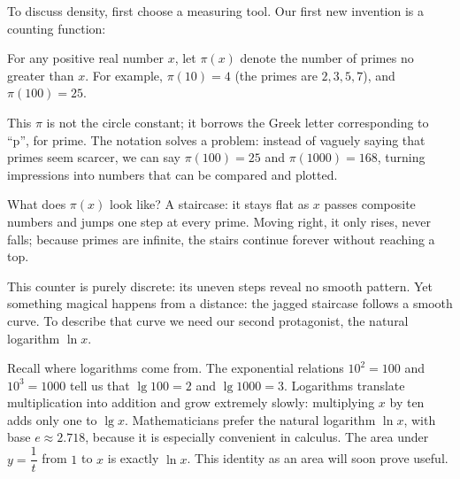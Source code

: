 To discuss density, first choose a measuring tool. Our first new invention is a counting function:

\begin{dingyi}
For any positive real number $x$, let $\pi(x)$ denote the number of primes no greater than $x$. For example, $\pi(10)=4$ (the primes are $2,3,5,7$), and $\pi(100)=25$.
\end{dingyi}

This $\pi$ is not the circle constant; it borrows the Greek letter corresponding to ``p'', for prime. The notation solves a problem: instead of vaguely saying that primes seem scarcer, we can say $\pi(100)=25$ and $\pi(1000)=168$, turning impressions into numbers that can be compared and plotted.

What does $\pi(x)$ look like? A staircase: it stays flat as $x$ passes composite numbers and jumps one step at every prime. Moving right, it only rises, never falls; because primes are infinite, the stairs continue forever without reaching a top.

\begin{center}
\end{center}

This counter is purely discrete: its uneven steps reveal no smooth pattern. Yet something magical happens from a distance: the jagged staircase follows a smooth curve. To describe that curve we need our second protagonist, the natural logarithm $\ln x$.

Recall where logarithms come from. The exponential relations $10^{2}=100$ and $10^{3}=1000$ tell us that $\lg 100=2$ and $\lg 1000=3$. Logarithms translate multiplication into addition and grow extremely slowly: multiplying $x$ by ten adds only one to $\lg x$. Mathematicians prefer the natural logarithm $\ln x$, with base $e\approx2.718$, because it is especially convenient in calculus. The area under $y=\dfrac{1}{t}$ from $1$ to $x$ is exactly $\ln x$. This identity as an area will soon prove useful.

